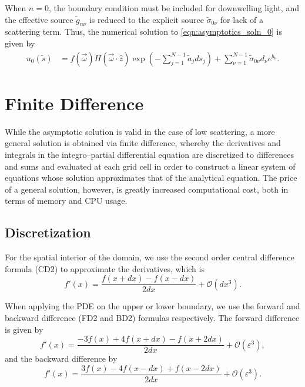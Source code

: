 When $n=0$, the boundary condition must be included for downwelling light,
and the effective source $\tilde{g}_{n\nu}$ is reduced to the explicit source $\tilde{\sigma}_{0\nu}$
for lack of a scattering term.
Thus, the numerical solution to \eqref{eqn:asymptotics_soln_0} is given by
\begin{align}
  u_0(\tilde{s}) &= f(\vec{\omega})H(\vec{\omega}\cdot\hat{z}) \exp\left( -\sum_{j=1}^{N-1}\tilde{a}_jds_j\right)
  + \sum_{\nu=1}^{N-1} \tilde{\sigma}_{0\nu}d_\nu e^{b_\nu}.
\end{align}

\section{Finite Difference}
While the asymptotic solution is valid in the case of low scattering, a more general solution is obtained via finite difference, whereby the derivatives and integrals in the integro--partial differential equation are discretized to differences and sums and evaluated at each grid cell in order to construct a linear system of equations whose solution approximates that of the analytical equation.
The price of a general solution, however, is greatly increased computational cost, both in terms of memory and CPU usage.

\subsection{Discretization}
\label{sec:discretization}

For the spatial interior of the domain, we use the second order central difference formula (CD2) to approximate the derivatives, which is
\begin{equation*}
    f'(x) = \frac{f(x+dx)-f(x-dx)}{2dx} + \mathcal{O}(dx^3).
\end{equation*}

When applying the PDE on the upper or lower boundary, we use the forward and backward difference (FD2 and BD2) formulas respectively.
The forward difference is given by
\begin{equation*}
    \label{eqn:FD2}
    f'(x) = \frac{-3f(x)+4f(x+dx)-f(x+2dx)}{2dx} + \mathcal{O}(\varepsilon^3),
\end{equation*}
and the backward difference by
\begin{equation*}
    \label{eqn:BD2}
    f'(x) = \frac{3f(x)-4f(x-dx)+f(x-2dx)}{2dx} + \mathcal{O}(\varepsilon^3).
\end{equation*}

